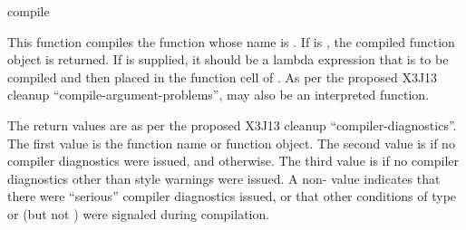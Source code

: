 \begin{defun}{}{compile}{ }
  
  This function compiles the function whose name is .  If
   is \false, the compiled function object is returned.  If
   is supplied, it should be a lambda expression that
  is to be compiled and then placed in the function cell of
  .  As per the proposed X3J13 cleanup
  ``compile-argument-problems'',  may also be an
  interpreted function.
  
  The return values are as per the proposed X3J13 cleanup
  ``compiler-diagnostics''.  The first value is the function name or
  function object.  The second value is \false{} if no compiler
  diagnostics were issued, and \true{} otherwise.  The third value is
  \false{} if no compiler diagnostics other than style warnings were
  issued.  A non-\false{} value indicates that there were ``serious''
  compiler diagnostics issued, or that other conditions of type
   or  (but not
  ) were signaled during compilation.
\end{defun}


